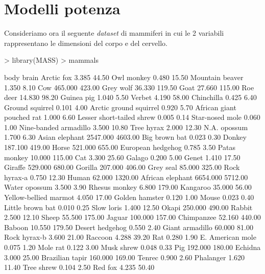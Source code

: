 \documentclass[onecolumn,12pt]{book}
\begin{document}
\section{Modelli potenza}
Consideriamo ora il seguente \emph{dataset} di mammiferi  in cui le 2 variabili rappresentano  le dimensioni del corpo e del cervello.
\begin{Schunk}
\begin{Sinput}
> library(MASS)
> mammals
\end{Sinput}
\begin{Soutput}
                              body   brain
Arctic fox                   3.385   44.50
Owl monkey                   0.480   15.50
Mountain beaver              1.350    8.10
Cow                        465.000  423.00
Grey wolf                   36.330  119.50
Goat                        27.660  115.00
Roe deer                    14.830   98.20
Guinea pig                   1.040    5.50
Verbet                       4.190   58.00
Chinchilla                   0.425    6.40
Ground squirrel              0.101    4.00
Arctic ground squirrel       0.920    5.70
African giant pouched rat    1.000    6.60
Lesser short-tailed shrew    0.005    0.14
Star-nosed mole              0.060    1.00
Nine-banded armadillo        3.500   10.80
Tree hyrax                   2.000   12.30
N.A. opossum                 1.700    6.30
Asian elephant            2547.000 4603.00
Big brown bat                0.023    0.30
Donkey                     187.100  419.00
Horse                      521.000  655.00
European hedgehog            0.785    3.50
Patas monkey                10.000  115.00
Cat                          3.300   25.60
Galago                       0.200    5.00
Genet                        1.410   17.50
Giraffe                    529.000  680.00
Gorilla                    207.000  406.00
Grey seal                   85.000  325.00
Rock hyrax-a                 0.750   12.30
Human                       62.000 1320.00
African elephant          6654.000 5712.00
Water opossum                3.500    3.90
Rhesus monkey                6.800  179.00
Kangaroo                    35.000   56.00
Yellow-bellied marmot        4.050   17.00
Golden hamster               0.120    1.00
Mouse                        0.023    0.40
Little brown bat             0.010    0.25
Slow loris                   1.400   12.50
Okapi                      250.000  490.00
Rabbit                       2.500   12.10
Sheep                       55.500  175.00
Jaguar                     100.000  157.00
Chimpanzee                  52.160  440.00
Baboon                      10.550  179.50
Desert hedgehog              0.550    2.40
Giant armadillo             60.000   81.00
Rock hyrax-b                 3.600   21.00
Raccoon                      4.288   39.20
Rat                          0.280    1.90
E. American mole             0.075    1.20
Mole rat                     0.122    3.00
Musk shrew                   0.048    0.33
Pig                        192.000  180.00
Echidna                      3.000   25.00
Brazilian tapir            160.000  169.00
Tenrec                       0.900    2.60
Phalanger                    1.620   11.40
Tree shrew                   0.104    2.50
Red fox                      4.235   50.40
\end{Soutput}
\end{Schunk}
\end{document}
